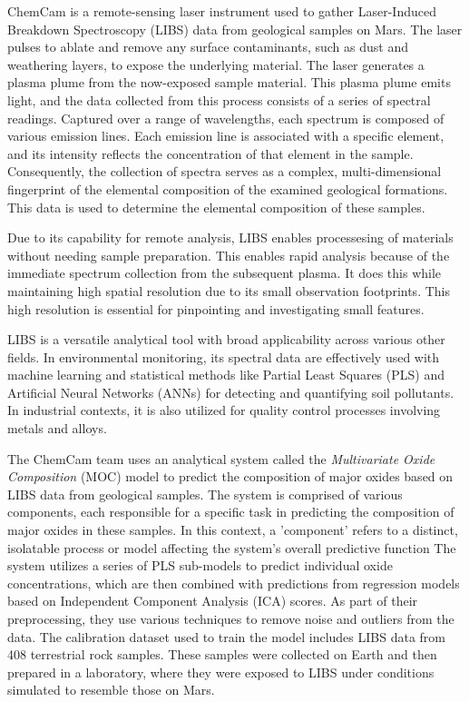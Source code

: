 ChemCam is a remote-sensing laser instrument used to gather Laser-Induced Breakdown Spectroscopy (LIBS) data from geological samples on Mars.
The laser pulses to ablate and remove any surface contaminants, such as dust and weathering layers, to expose the underlying material.
The laser generates a plasma plume from the now-exposed sample material.
This plasma plume emits light, and the data collected from this process consists of a series of spectral readings.
Captured over a range of wavelengths, each spectrum is composed of various emission lines.
Each emission line is associated with a specific element, and its intensity reflects the concentration of that element in the sample.
Consequently, the collection of spectra serves as a complex, multi-dimensional fingerprint of the elemental composition of the examined geological formations.
This data is used to determine the elemental composition of these samples.\cite{cleggRecalibrationMarsScience2017}

Due to its capability for remote analysis, LIBS enables processesing of materials without needing sample preparation. This enables rapid analysis because of the immediate spectrum collection from the subsequent plasma. It does this while maintaining high spatial resolution due to its small observation footprints. This high resolution is essential for pinpointing and investigating small features.\cite{wiensChemcam2012}

LIBS is a versatile analytical tool with broad applicability across various other fields. In environmental monitoring, its spectral data are effectively used with machine learning and statistical methods like Partial Least Squares (PLS) and Artificial Neural Networks (ANNs) for detecting and quantifying soil pollutants. In industrial contexts, it is also utilized for quality control processes involving metals and alloys\cite{huang_progress_2023}.

The ChemCam team uses an analytical system called the \textit{Multivariate Oxide Composition} (MOC) model to predict the composition of major oxides based on LIBS data from geological samples.
The system is comprised of various components, each responsible for a specific task in predicting the composition of major oxides in these samples.
In this context, a 'component' refers to a distinct, isolatable process or model affecting the system's overall predictive function
The system utilizes a series of PLS sub-models to predict individual oxide concentrations, which are then combined with predictions from regression models based on Independent Component Analysis (ICA) scores.
As part of their preprocessing, they use various techniques to remove noise and outliers from the data.\cite{cleggRecalibrationMarsScience2017}
The calibration dataset used to train the model includes LIBS data from 408 terrestrial rock samples. These samples were collected on Earth and then prepared in a laboratory, where they were exposed to LIBS under conditions simulated to resemble those on Mars\cite{cleggRecalibrationMarsScience2017}.


